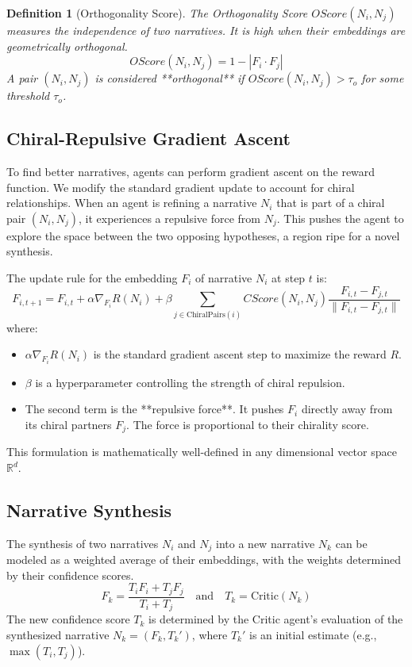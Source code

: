 \documentclass[12pt, a4paper]{article}
\newtheorem{definition}{Definition}
\begin{document}
\begin{definition}[Orthogonality Score]
The Orthogonality Score $OScore(N_i, N_j)$ measures the independence of two narratives. It is high when their embeddings are geometrically orthogonal.
\[
OScore(N_i, N_j) = 1 - |F_i \cdot F_j|
\]
A pair $(N_i, N_j)$ is considered **orthogonal** if $OScore(N_i, N_j) > \tau_o$ for some threshold $\tau_o$.
\end{definition}

\subsection{Chiral-Repulsive Gradient Ascent}
To find better narratives, agents can perform gradient ascent on the reward function. We modify the standard gradient update to account for chiral relationships. When an agent is refining a narrative $N_i$ that is part of a chiral pair $(N_i, N_j)$, it experiences a repulsive force from $N_j$. This pushes the agent to explore the space between the two opposing hypotheses, a region ripe for a novel synthesis.

The update rule for the embedding $F_i$ of narrative $N_i$ at step $t$ is:
\begin{equation} \label{eq:crga}
F_{i, t+1} = F_{i, t} + \alpha \nabla_{F_i} R(N_i) + \beta \sum_{j \in \text{ChiralPairs}(i)} CScore(N_i, N_j) \frac{F_{i, t} - F_{j, t}}{\|F_{i, t} - F_{j, t}\|}
\end{equation}
where:
\begin{itemize}
    \item $\alpha \nabla_{F_i} R(N_i)$ is the standard gradient ascent step to maximize the reward $R$.
    \item $\beta$ is a hyperparameter controlling the strength of chiral repulsion.
    \item The second term is the **repulsive force**. It pushes $F_i$ directly away from its chiral partners $F_j$. The force is proportional to their chirality score.
\end{itemize}
This formulation is mathematically well-defined in any dimensional vector space $\mathbb{R}^d$.

\subsection{Narrative Synthesis}
The synthesis of two narratives $N_i$ and $N_j$ into a new narrative $N_k$ can be modeled as a weighted average of their embeddings, with the weights determined by their confidence scores.
\begin{equation}
F_k = \frac{T_i F_i + T_j F_j}{T_i + T_j} \quad \text{and} \quad T_k = \text{Critic}(N_k)
\end{equation}
The new confidence score $T_k$ is determined by the Critic agent's evaluation of the synthesized narrative $N_k = (F_k, T_k')$, where $T_k'$ is an initial estimate (e.g., $\max(T_i, T_j)$).
\end{document}
